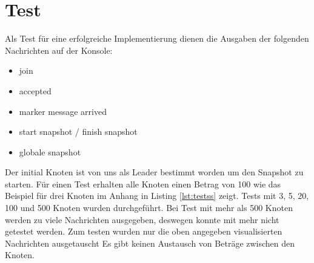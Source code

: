 \section{Test}
\label{sec:test}
Als Test für eine erfolgreiche Implementierung dienen die Ausgaben der
folgenden Nachrichten auf der Konsole:
\begin{itemize}
  \item join
  \item accepted
  \item marker message arrived
  \item start snapshot / finish snapshot
  \item globale snapshot
\end{itemize}

Der initial Knoten ist von uns als Leader bestimmt worden um den Snapshot zu starten. 
Für einen Test erhalten alle Knoten einen Betrag von 100 wie das Beispiel für drei 
Knoten im Anhang in Listing \ref{lst:testss} zeigt. Tests mit 3, 5, 20, 100 und 500 
Knoten wurden durchgeführt. Bei Test mit mehr als 500 Knoten werden zu viele Nachrichten
ausgegeben, deswegen konnte mit mehr nicht getestet werden.
Zum testen wurden nur die oben angegeben visualisierten Nachrichten ausgetauscht
Es gibt keinen Austausch von Beträge zwischen den Knoten.
